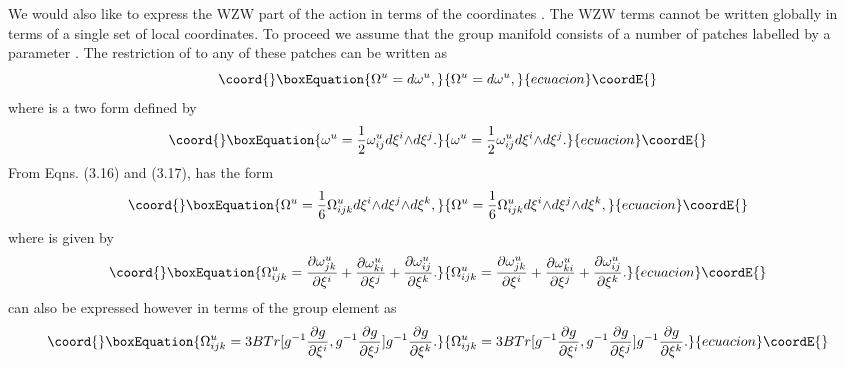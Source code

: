 \documentclass[a4paper,12pt]{article}
\begin{document}
We would also like to express the WZW part of the action in terms of the
coordinates \myHighlight{$\xi$}\coordHE{}. The WZW terms cannot be written globally in terms of a
single set of local coordinates. To proceed we 
assume that the group manifold
consists of a number of patches labelled by a parameter \coordHE{}. 
The restriction of 
\coordHE{} to any of these patches can be written as 
\begin{equation}\coord{}\boxEquation{
{\Omega}^{u}=d{\omega}^{u},
}{
{\Omega}^{u}=d{\omega}^{u},
}{ecuacion}\coordE{}\end{equation}
where \coordHE{} is  a two form defined by 
\begin{equation}\coord{}\boxEquation{
{\omega}^{u}=\frac{1}{2}{\omega}^{u}_{ij} d{\xi}^{i}{\wedge}d{\xi}^{j}.
}{
{\omega}^{u}=\frac{1}{2}{\omega}^{u}_{ij} d{\xi}^{i}{\wedge}d{\xi}^{j}.
}{ecuacion}\coordE{}\end{equation}
From Eqns. (3.16) and (3.17),  \coordHE{} has the form
\begin{equation}\coord{}\boxEquation{
{\Omega}^{u}=\frac{1}{6}{\Omega}^{u}_{ijk}d{\xi}^{i}{\wedge}d{\xi}^{j}
{\wedge}d{\xi}^{k},
}{
{\Omega}^{u}=\frac{1}{6}{\Omega}^{u}_{ijk}d{\xi}^{i}{\wedge}d{\xi}^{j}
{\wedge}d{\xi}^{k},
}{ecuacion}\coordE{}\end{equation}
where \coordHE{} is given by
\begin{equation}\coord{}\boxEquation{
{\Omega}^{u}_{ijk}=\frac{{\partial}{\omega}^{u}_{jk}}{{\partial}{\xi}^{i}} 
+ \frac{{\partial}{\omega}^{u}_{ki}}{{\partial}{\xi}^{j}} 
+ \frac{{\partial}{\omega}^{u}_{ij}}{{\partial}{\xi}^{k}}.
}{
{\Omega}^{u}_{ijk}=\frac{{\partial}{\omega}^{u}_{jk}}{{\partial}{\xi}^{i}} 
+ \frac{{\partial}{\omega}^{u}_{ki}}{{\partial}{\xi}^{j}} 
+ \frac{{\partial}{\omega}^{u}_{ij}}{{\partial}{\xi}^{k}}.
}{ecuacion}\coordE{}\end{equation}
\coordHE{} can also be expressed however
 in terms of the group element \coordHE{}
as 
\begin{equation}\coord{}\boxEquation{
{\Omega}^{u}_{ijk}=3BTr[g^{-1}{\frac{{\partial}g}
{{\partial}{\xi}^{i}}},g^{-1}{\frac{{\partial}g}
{{\partial}{\xi}^{j}}}]g^{-1}{\frac{{\partial}g}{{\partial}{\xi}^{k}}}.
}{
{\Omega}^{u}_{ijk}=3BTr[g^{-1}{\frac{{\partial}g}
{{\partial}{\xi}^{i}}},g^{-1}{\frac{{\partial}g}
{{\partial}{\xi}^{j}}}]g^{-1}{\frac{{\partial}g}{{\partial}{\xi}^{k}}}.
}{ecuacion}\coordE{}\end{equation}
\end{document}
